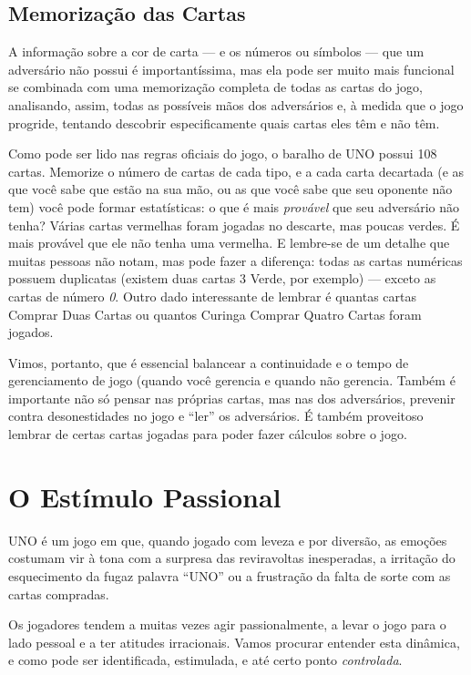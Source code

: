\subsection{Memorização das Cartas}

\label{memorizacaodascartas}

A informação sobre a cor de carta --- e os números ou símbolos --- que um adversário não possui é importantíssima, mas ela pode ser muito mais funcional se combinada com uma memorização completa de todas as cartas do jogo, analisando, assim, todas as possíveis mãos dos adversários e, à medida que o jogo progride, tentando descobrir especificamente quais cartas eles têm e não têm.

Como pode ser lido nas regras oficiais do jogo, o baralho de UNO possui 108 cartas. Memorize o número de cartas de cada tipo, e a cada carta decartada (e as que você sabe que estão na sua mão, ou as que você sabe que seu oponente não tem) você pode formar estatísticas: o que é mais \textit{provável} que seu adversário não tenha? Várias cartas vermelhas foram jogadas no descarte, mas poucas verdes. É mais provável que ele não tenha uma vermelha. E lembre-se de um detalhe que muitas pessoas não notam, mas pode fazer a diferença: todas as cartas numéricas possuem duplicatas (existem duas cartas 3 Verde, por exemplo) --- exceto as cartas de número \textit{0}. Outro dado interessante de lembrar é quantas cartas Comprar Duas Cartas ou quantos Curinga Comprar Quatro Cartas foram jogados.

Vimos, portanto, que é essencial balancear a continuidade e o tempo de gerenciamento de jogo (quando você gerencia e quando não gerencia. Também é importante não só pensar nas próprias cartas, mas nas dos adversários, prevenir contra desonestidades no jogo e ``ler'' os adversários. É também proveitoso lembrar de certas cartas jogadas para poder fazer cálculos sobre o jogo.

\section{O Estímulo Passional}

UNO é um jogo em que, quando jogado com leveza e por diversão, as emoções costumam vir à tona com a surpresa das reviravoltas inesperadas, a irritação do esquecimento da fugaz palavra ``UNO'' ou a frustração da falta de sorte com as cartas compradas.

Os jogadores tendem a muitas vezes agir passionalmente, a levar o jogo para o lado pessoal e a ter atitudes irracionais. Vamos procurar entender esta dinâmica, e como pode ser identificada, estimulada, e até certo ponto \textit{controlada}.


